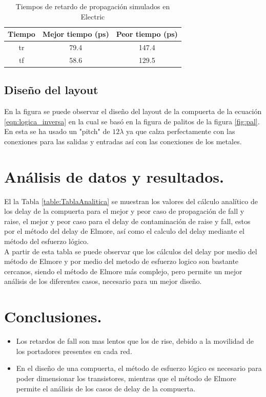 \documentclass[12pt,a4paper]{article} %
\begin{document}
\begin{table}\label{table:Tabla_propagacion}
\begin{center}
\begin{tabular}{c||c||c}
Tiempo  & Mejor tiempo (ps) & Peor tiempo (ps)\\
\hline
\hline
tr & 79.4 & 147.4 \\
tf & 58.6 & 129.5 \\
\hline
\end{tabular}
\caption{Tiempos de retardo de propagación simulados en Electric}
\end{center}
\end{table}

\subsection{Diseño del layout}

En la figura  se puede observar el diseño del layout de la compuerta de la ecuación \ref{eqn:logica_inversa} en la cual se basó en la figura de palitos de la figura \ref{fig:pal}. En esta se ha usado un "pitch" de $12\lambda$ ya que calza perfectamente con las conexiones para las salidas y entradas así con las conexiones de los metales.

\section{Análisis de datos y resultados.}

El la Tabla \ref{table:TablaAnalitica} se muestran los valores del cálculo analítico de los delay de la compuerta para el mejor y peor caso de propagación de fall y raise, el mejor y peor caso para el delay de contaminación de raise y fall, estos por el método del delay de Elmore, así como el calculo del delay mediante el método del esfuerzo lógico.\\

A partir de esta tabla se puede observar que los cálculos del delay por medio del método de Elmore y por medio del metodo de esfuerzo logico son bastante cercanos, siendo el método de Elmore más complejo, pero permite un mejor análisis de los diferentes casos, necesario para un mejor diseño.\\


\section{Conclusiones.}
\begin{itemize}
\item Los retardos de fall son mas lentos que los de rise, debido a la movilidad de los portadores presentes en cada red.
\item En el diseño de una compuerta, el método de esfuerzo lógico es necesario para poder dimensionar los transistores, mientras que el método de Elmore permite el análisis de los casos de delay de la compuerta.
\end{itemize}
\end{document}
